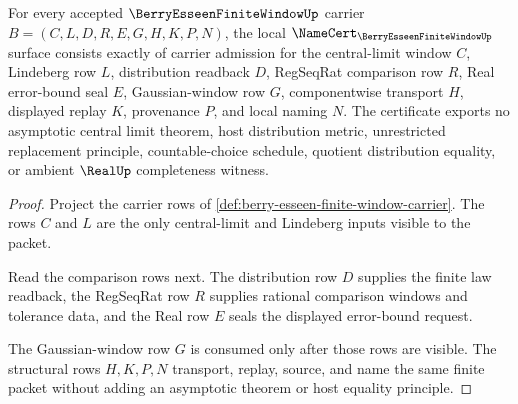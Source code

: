 \begin{theorem}
\label{thm:berry-esseen-finite-window-namecert-obligations}
For every accepted $\BerryEsseenFiniteWindowUp$ carrier $B=(C,L,D,R,E,G,H,K,P,N)$, the local $\NameCert_{\BerryEsseenFiniteWindowUp}$ surface consists exactly of carrier admission for the central-limit window $C$, Lindeberg row $L$, distribution readback $D$, RegSeqRat comparison row $R$, Real error-bound seal $E$, Gaussian-window row $G$, componentwise transport $H$, displayed replay $K$, provenance $P$, and local naming $N$. The certificate exports no asymptotic central limit theorem, host distribution metric, unrestricted replacement principle, countable-choice schedule, quotient distribution equality, or ambient $\RealUp$ completeness witness.
\end{theorem}
\begin{proof}
Project the carrier rows of \autoref{def:berry-esseen-finite-window-carrier}. The rows $C$ and $L$ are the only central-limit and Lindeberg inputs visible to the packet.

Read the comparison rows next. The distribution row $D$ supplies the finite law readback, the RegSeqRat row $R$ supplies rational comparison windows and tolerance data, and the Real row $E$ seals the displayed error-bound request.

The Gaussian-window row $G$ is consumed only after those rows are visible. The structural rows $H,K,P,N$ transport, replay, source, and name the same finite packet without adding an asymptotic theorem or host equality principle.
\end{proof}

